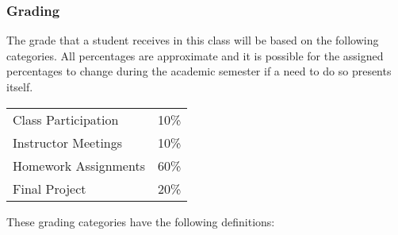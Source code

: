 \subsubsection*{Grading}

The grade that a student receives in this class will be based on the
following categories. All percentages are approximate and it is possible
for the assigned percentages to change during the academic semester if a
need to do so presents itself. 

\begin{center}
\begin{tabular}{ll}
Class Participation & 10\% \\
Instructor Meetings & 10\% \\
Homework Assignments & 60\% \\
Final Project & 20\%
\end{tabular}
\end{center}

\vspace*{-.1in}
\noindent
These grading categories have the following definitions:
\vspace*{-.1in}


